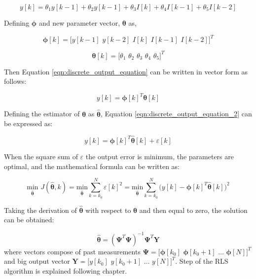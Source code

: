\documentclass[12pt]{article}
\begin{document}
\begin{equation}
	\label{eqn:discrete_output_equation}
	y[k] = \theta_{1}y[k-1] + \theta_{2}y[k-1] + \theta_{3}I[k] + \theta_{4}I[k-1] + \theta_{5}I[k-2]
\end{equation}

\noindent Defining $\bm{\phi}$ and new parameter vector, $\bm{\theta}$ as,

\begin{equation}
	\label{eqn:RLS_psi_vector}
	\bm{\phi}[k] = \bigg[y[k-1]\,\,y[k-2]\,\,I[k]\,\,I[k-1]\,\,I[k-2]\bigg]^{T} 
\end{equation}

\begin{equation}
	\label{eqn:RLS_theta_vector}
	\bm{\theta}[k] = \big[\theta_{1}\,\,\theta_{2}\,\,\theta_{3}\,\,\theta_{4}\,\,\theta_{5}\big]^{T} 
\end{equation}

\noindent Then Equation \ref{eqn:discrete_output_equation} can be written in vector form as follows:

\begin{equation}
	\label{eqn:discrete_output_equation_2}
	y[k] = \bm{\phi}[k]^{T}\bm{\theta}[k]
\end{equation}

\noindent Defining the estimator of $\bm{\theta}$ as $\bm{\hat{\theta}}$, Equation \ref{eqn:discrete_output_equation_2} can be expressed as:

\begin{equation}
	\label{eqn:discrete_output_equation_3}
	y[k] = \bm{\phi}[k]^{T}\bm{\hat{\theta}}[k] + \varepsilon[k]
\end{equation}	

\noindent When the square sum of $\varepsilon$ the output error is minimum, the parameters are optimal, and the mathematical formula
can be written as:

\begin{equation}
	\label{eqn:RLS}
	\underset{\bm{\hat{\theta}}}{\text{min}} \,\,\bm{\textit{J}}(\bm{\hat{\theta}},k) = \underset{\bm{\hat{\theta}}}{\text{min}} \sum_{k=k_{0}}^{N}\varepsilon[k]^{2} = \underset{\bm{\hat{\theta}}}{\text{min}} \sum_{k=k_{0}}^{N}\bigg(y[k] - \bm{\phi}[k]^{T}\bm{\hat{\theta}}[k]\bigg)^{2}
\end{equation}

\noindent Taking the derivation of $\bm{\hat{\theta}}$ with respect to $\bm{\theta}$ and then equal to zero, the solution can be obtained:

\begin{equation}
	\label{eqn:Least_square_one_step_solution}
	\bm{\hat{\theta}} = (\bm{\Psi}^{T}\bm{\Psi})^{-1}\bm{\Psi}^{T}\bm{Y}
\end{equation}
where vectors compose of past measurements $\bm{\Psi}= \big[\bm{\phi}[k_{0}]\,\,\bm{\phi}[k_{0}+1]\,\,\dots\,\,\bm{\phi}[N]\big]^{T}$ and big output vector $\bm{Y}=\big[y[k_{0}]\,\,y[k_{0}+1]\,\,\dots\,\,y[N]\big]^{T}$. Step of the RLS algorithm is explained following chapter.
\end{document}
